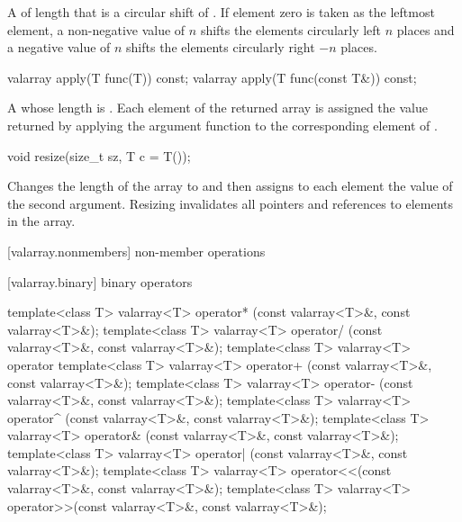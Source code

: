 \begin{itemdescr}
\pnum
\returns
A  of length 
that is a circular shift of . If element zero is taken as
the leftmost element, a non-negative value of $n$ shifts
the elements circularly left $n$ places and a negative
value of $n$ shifts the elements circularly right $-n$ places.
\end{itemdescr}

%
\begin{itemdecl}
valarray apply(T func(T)) const;
valarray apply(T func(const T&)) const;
\end{itemdecl}

\begin{itemdescr}
\pnum
\returns
A  whose length is .
Each element of the returned array is assigned
the value returned by applying the argument function to the
corresponding element of .
\end{itemdescr}

%
\begin{itemdecl}
void resize(size_t sz, T c = T());
\end{itemdecl}

\begin{itemdescr}
\pnum
\effects
Changes the length of the  array to 
and then assigns to each element the value of the second argument.
Resizing invalidates all pointers and references to elements in the array.
\end{itemdescr}

[valarray.nonmembers]{ non-member operations}

[valarray.binary]{ binary operators}

%
%
%
%
%
%
%
%
%
%
\begin{itemdecl}
template<class T> valarray<T> operator* (const valarray<T>&, const valarray<T>&);
template<class T> valarray<T> operator/ (const valarray<T>&, const valarray<T>&);
template<class T> valarray<T> operator%
template<class T> valarray<T> operator+ (const valarray<T>&, const valarray<T>&);
template<class T> valarray<T> operator- (const valarray<T>&, const valarray<T>&);
template<class T> valarray<T> operator^ (const valarray<T>&, const valarray<T>&);
template<class T> valarray<T> operator& (const valarray<T>&, const valarray<T>&);
template<class T> valarray<T> operator| (const valarray<T>&, const valarray<T>&);
template<class T> valarray<T> operator<<(const valarray<T>&, const valarray<T>&);
template<class T> valarray<T> operator>>(const valarray<T>&, const valarray<T>&);
\end{itemdecl}

